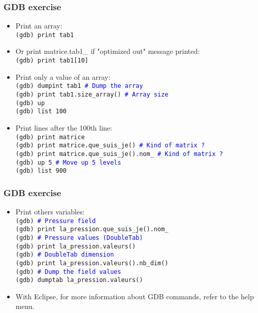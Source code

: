 \documentclass[10pt, hyperref={unicode=true,pdfusetitle, bookmarks=true,bookmarksnumbered=false,bookmarksopen=false, breaklinks=false,pdfborder={0 0 1},backref=true,colorlinks=true,linkcolor=darkblue,pageanchor, urlcolor=darkblue}]{beamer}
\begin{document}
\begin{frame}
\frametitle{GDB exercise}
\begin{itemize}
\item Print an array:\\
\texttt{(gdb) print tab1}

\item Or print matrice.tab1\_ if "optimized out" message printed:\\
\texttt{(gdb) print tab1[10]}

\item Print only a value of an array:\\
\texttt{(gdb) dumpint tab1 \textcolor{blue}{\# Dump the array}} \\
\texttt{(gdb) print tab1.size\_array() \textcolor{blue}{\# Array size}}\\
\texttt{(gdb) up}\\
\texttt{(gdb) list 100}

\item Print lines after the 100th line:\\
\texttt{(gdb) print matrice}\\
\texttt{(gdb) print matrice.que\_suis\_je() \textcolor{blue}{\# Kind of matrix ?}}\\
\texttt{(gdb) print matrice.que\_suis\_je().nom\_ \textcolor{blue}{\# Kind of matrix ?}}\\
\texttt{(gdb) up 5 \textcolor{blue}{\# Move up 5 levels}}\\
\texttt{(gdb) list 900}\\
\end{itemize}
\end{frame}
\begin{frame}
\frametitle{GDB exercise}
\begin{itemize}
\item Print others variables:\\
\texttt{(gdb) \textcolor{blue}{\# Pressure field}}\\
\texttt{(gdb) print la\_pression.que\_suis\_je().nom\_}\\
\texttt{(gdb) \textcolor{blue}{\# Pressure values (DoubleTab)}}\\
\texttt{(gdb) print la\_pression.valeurs()}\\
\texttt{(gdb) \textcolor{blue}{\# DoubleTab dimension}}\\
\texttt{(gdb) print la\_pression.valeurs().nb\_dim()}\\
\texttt{(gdb) \textcolor{blue}{\# Dump the field values}}\\
\texttt{(gdb) dumptab la\_pression.valeurs()}
\end{itemize}
\begin{itemize}
\item With Eclipse, for more information about GDB commands, refer to the help menu.\\
\end{itemize}
\end{frame}
\end{document}
